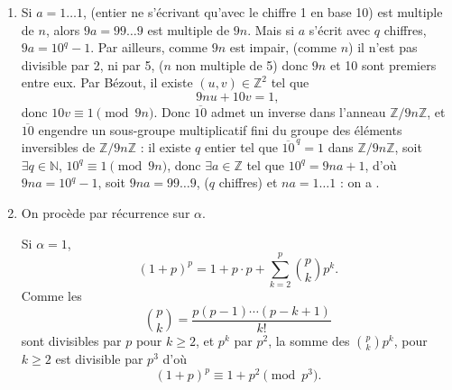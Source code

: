 \begin{enumerate}[label=\arabic*.,leftmargin=2.2em,itemsep=1.2em]
On a
\[
1992=398\times5+2=79\times25+17=15\times125+117=3\times625+117,
\]
donc $p_1=398$, $p_2=79$, $p_3=15$, $p_4=3$, et $p_k=0$ si $k\ge5$.

Il y a donc $p_4$ multiples de 625 inférieurs à 1992, puis $p_3-p_4$ multiples de 125 qui ne sont pas en même temps multiples de 625 ; $p_2-p_3$ multiples de 25 sans être multiples de 125, et $p_1-p_2$ multiples de 5 .

L'exposant de 5 sera donc
\[
1(p_1-p_2)+2(p_2-p_3)+3(p_3-p_4)+4p_4=p_1+p_2+p_3+p_4=495.
\]
Comme 2 intervient « plus souvent » l'exposant de 10 dans l'écriture décimale de $1992!$ sera 495 : il y a 495 zéros.

\item Si $a=1\ldots1$, (entier ne s'écrivant qu'avec le chiffre 1 en base 10) est multiple de $n$, alors $9a=99\ldots9$ est multiple de $9n$. Mais si $a$ s'écrit avec $q$ chiffres, $9a=10^q-1$. Par ailleurs, comme $9n$ est impair, (comme $n$) il n'est pas divisible par 2, ni par 5, ($n$ non multiple de 5) donc $9n$ et 10 sont premiers entre eux. Par Bézout, il existe $(u,v)\in\mathbb Z^2$ tel que
\[
9nu+10v=1,
\]
donc $10v\equiv1\pmod{9n}$. Donc $\overline{10}$ admet un inverse dans l'anneau $\mathbb Z/9n\mathbb Z$, et $\overline{10}$ engendre un sous-groupe multiplicatif fini du groupe des éléments inversibles de $\mathbb Z/9n\mathbb Z$ : il existe $q$ entier tel que $\overline{10}^{\,q}=1$ dans $\mathbb Z/9n\mathbb Z$, soit $\exists q\in\mathbb N$, $10^q\equiv1\pmod{9n}$, donc $\exists a\in\mathbb Z$ tel que $10^q=9na+1$, d'où $9na=10^q-1$, soit $9na=99\ldots9$, ($q$ chiffres) et $na=1\ldots1$ : on a .

\item On procède par récurrence sur $\alpha$.

Si $\alpha=1$,
\[
(1+p)^p=1+p\cdot p+\sum_{k=2}^{p}\binom pk p^k.
\]
Comme les
\[
\binom pk=\frac{p(p-1)\cdots(p-k+1)}{k!}
\]
sont divisibles par $p$ pour $k\ge2$, et $p^k$ par $p^2$, la somme des $\binom pkp^k$, pour $k\ge2$ est divisible par $p^3$ d'où
\[
(1+p)^p\equiv1+p^2\pmod{p^3}.
\]


\end{enumerate}
